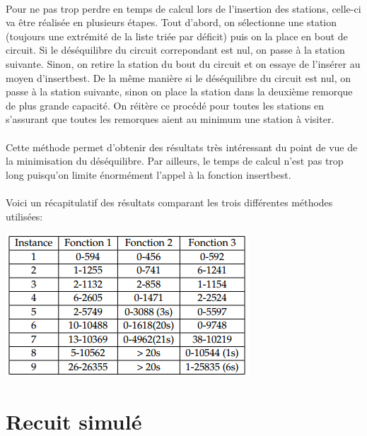 \documentclass[a4paper, 11pt]{article} %
\begin{document}
\paragraph*{}
Pour ne pas trop perdre en temps de calcul lors de l'insertion des stations, celle-ci va être réalisée en plusieurs étapes. Tout d'abord, on sélectionne une station (toujours une extrémité de la liste triée par déficit) puis on la place en bout de circuit. Si le déséquilibre du circuit correpondant est nul, on passe à la station suivante. Sinon, on retire la station du bout du circuit et on essaye de l'insérer au moyen d'insertbest. De la même manière si le déséquilibre du circuit est nul, on passe à la station suivante, sinon on place la station dans la deuxième remorque de plus grande capacité. On réitère ce procédé pour toutes les stations en s'assurant que toutes les remorques aient au minimum une station à visiter.

\paragraph*{}
Cette méthode permet d'obtenir des résultats très intéressant du point de vue de la minimisation du déséquilibre. Par ailleurs, le temps de calcul n'est pas trop long puisqu'on limite énormément l'appel à la fonction insertbest.

\paragraph*{}
Voici un récapitulatif des résultats comparant les trois différentes méthodes utilisées:
\begin{center}
\includegraphics{glouton.png}
\end{center}




\section{Recuit simulé}
\end{document}

